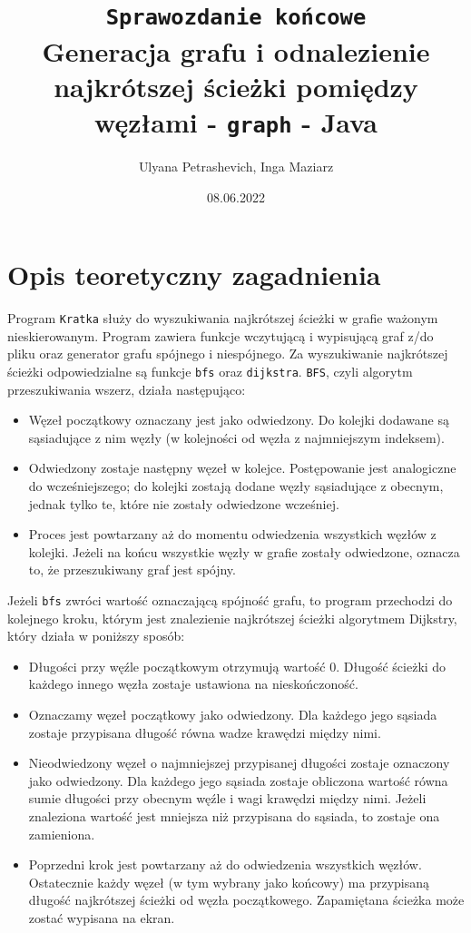 \documentclass[]{article}
\title{\texttt{Sprawozdanie końcowe}\\Generacja grafu i odnalezienie najkrótszej ścieżki pomiędzy węzłami - \texttt{graph} - Java}
\author{Ulyana Petrashevich, Inga Maziarz}
\date{08.06.2022}
\begin{document}
\maketitle
\tableofcontents
\thispagestyle{empty}
\newpage

\section{Opis teoretyczny zagadnienia}\label{header-n231}

Program \texttt{Kratka} służy do wyszukiwania najkrótszej ścieżki w grafie ważonym nieskierowanym. Program zawiera funkcje wczytującą i wypisującą graf z/do pliku oraz generator grafu spójnego i niespójnego. Za wyszukiwanie najkrótszej ścieżki odpowiedzialne są funkcje \texttt{bfs} oraz \texttt{dijkstra}. \texttt{BFS}, czyli algorytm przeszukiwania wszerz, działa następująco: 
\begin{itemize}
\item
  Węzeł początkowy oznaczany jest jako odwiedzony. Do kolejki dodawane są sąsiadujące z nim węzły (w kolejności od węzła z najmniejszym indeksem).
\item
  Odwiedzony zostaje następny węzeł w kolejce. Postępowanie jest analogiczne do wcześniejszego; do kolejki zostają dodane węzły sąsiadujące z obecnym, jednak tylko te, które nie zostały odwiedzone wcześniej.
  
\item
  Proces jest powtarzany aż do momentu odwiedzenia wszystkich węzłów z kolejki. Jeżeli na końcu wszystkie węzły w grafie zostały odwiedzone, oznacza to, że przeszukiwany graf jest spójny. 
\end{itemize}
Jeżeli \texttt{bfs} zwróci wartość oznaczającą spójność grafu, to program przechodzi do kolejnego kroku, którym jest znalezienie najkrótszej ścieżki algorytmem Dijkstry, który działa w poniższy sposób:
\begin{itemize}
\item
Długości przy węźle początkowym otrzymują wartość 0. Długość ścieżki do każdego innego węzła zostaje ustawiona na nieskończoność. 
\item
  Oznaczamy węzeł początkowy jako odwiedzony. Dla każdego jego sąsiada zostaje przypisana długość równa wadze krawędzi między nimi. 
\item
  Nieodwiedzony węzeł o najmniejszej przypisanej długości zostaje oznaczony jako odwiedzony. Dla każdego jego sąsiada zostaje obliczona wartość równa sumie długości przy obecnym węźle i wagi krawędzi między nimi. Jeżeli znaleziona wartość jest mniejsza niż przypisana do sąsiada, to zostaje ona zamieniona. 
\item
  Poprzedni krok jest powtarzany aż do odwiedzenia wszystkich węzłów. Ostatecznie każdy węzeł (w tym wybrany jako końcowy) ma przypisaną długość najkrótszej ścieżki od węzła początkowego. Zapamiętana ścieżka może zostać wypisana na ekran.
\end{itemize}
\end{document}
